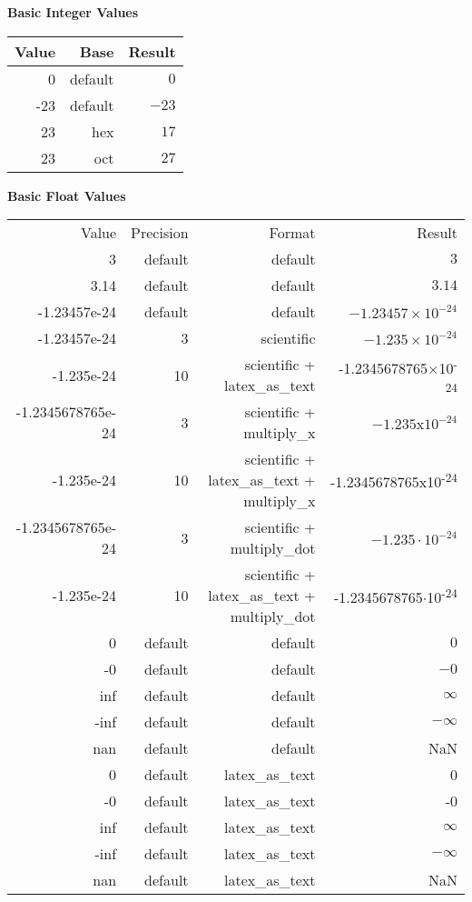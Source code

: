 \documentclass[10pt]{article}
\begin{document}
\textbf{Basic Integer Values}

\begin{tabular}{r r r}
Value & Base & Result \\ \hline 
0 & default & $0$\\
-23 & default & $-23$ \\
23 & hex & $17$\\
23 & oct & $27$\\
\end{tabular}

\textbf{Basic Float Values}

\begin{tabular}{r r r r}
Value & Precision & Format & Result \\
3 & default & default & $3$ \\
3.14 & default & default & $3.14$ \\
-1.23457e-24 & default & default & $-1.23457\times 10^{-24}$ \\
-1.23457e-24 & 3 & scientific & $-1.235\times 10^{-24}$ \\
-1.235e-24 & 10 & scientific + latex\_as\_text & -1.2345678765$\times$10\textsuperscript{-24} \\
-1.2345678765e-24 & 3 & scientific + multiply\_x & $-1.235\mathrm{x} 10^{-24}$ \\
-1.235e-24 & 10 & scientific + latex\_as\_text + multiply\_x & -1.2345678765x10\textsuperscript{-24} \\
-1.2345678765e-24 & 3 & scientific + multiply\_dot & $-1.235\cdot 10^{-24}$ \\
-1.235e-24 & 10 & scientific + latex\_as\_text + multiply\_dot & -1.2345678765$\cdot$10\textsuperscript{-24} \\
0 & default & default & $0$ \\
-0 & default & default & $-0$ \\
inf & default & default & $\infty$ \\
-inf & default & default & $-\infty$ \\
nan & default & default & NaN \\
0 & default & latex\_as\_text & 0 \\
-0 & default & latex\_as\_text & -0 \\
inf & default & latex\_as\_text & $\infty$ \\
-inf & default & latex\_as\_text & $-\infty$ \\
nan & default & latex\_as\_text & NaN \\
\end{tabular}
\end{document}
